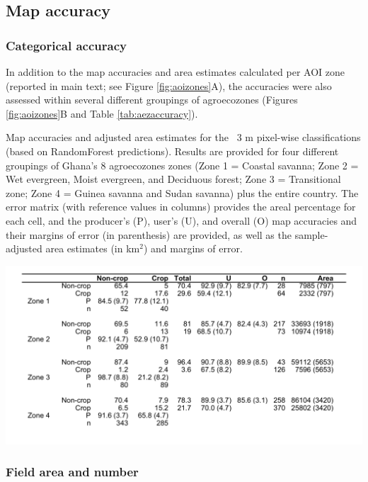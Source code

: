 \documentclass[
  11pt,
  a4paper]{article}
\begin{document}
\hypertarget{map-accuracy}{%
\subsection{Map accuracy}\label{map-accuracy}}

\hypertarget{categorical-accuracy}{%
\subsubsection{Categorical accuracy}\label{categorical-accuracy}}

In addition to the map accuracies and area estimates calculated per AOI
zone (reported in main text; see Figure \ref{fig:aoizones}A), the
accuracies were also assessed within several different groupings of
agroecozones (Figures \ref{fig:aoizones}B and Table
\ref{tab:aezaccuracy}).

\begin{table}
\caption{Map accuracies and adjusted area estimates for the ~3 m pixel-wise classifications (based on RandomForest predictions). Results are provided for four different groupings of Ghana's 8 agroecozones zones (Zone 1 = Coastal savanna; Zone 2 = Wet evergreen, Moist evergreen, and Deciduous forest; Zone 3 = Transitional zone; Zone 4 = Guinea savanna and Sudan savanna) plus the entire country. The error matrix (with reference values in columns) provides the areal percentage for each cell, and the producer's (P), user's (U), and overall (O) map accuracies and their margins of error (in parenthesis) are provided, as well as the sample-adjusted area estimates (in km$^{2}$) and margins of error.}
\begin{center}
\includegraphics[width = 16cm]{figures/si_aez_accuracies.png}
\end{center}
\label{tab:aezaccuracy}
\end{table}

\hypertarget{field-area-and-number}{%
\subsubsection{Field area and number}\label{field-area-and-number}}
\end{document}
